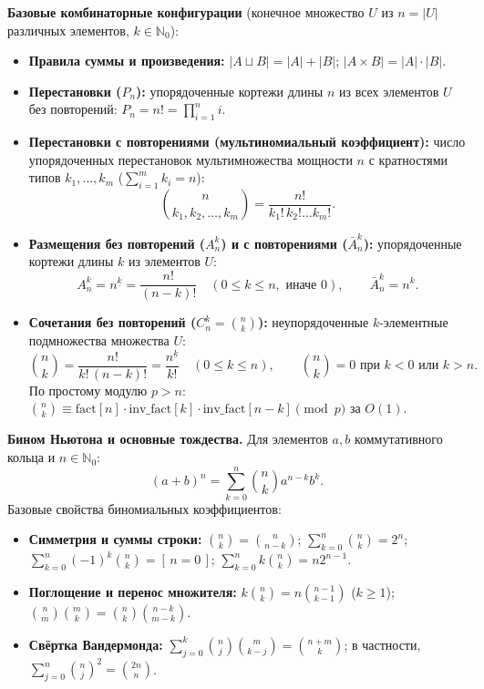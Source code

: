\documentclass[10pt,a4paper]{article}
\renewcommand{\le}{\leqslant}
\renewcommand{\ge}{\geqslant}
\newcommand{\N}{\mathbb{N}}
\newcommand{\iverson}[1]{[\,#1\,]}
\newcommand{\fall}[2]{#1^{\underline{#2}}}
\begin{document}
\textbf{Базовые комбинаторные конфигурации} (конечное множество $U$ из $n = |U|$ различных элементов, $k \in \N_0$):
\begin{itemize}
  \item \textbf{Правила суммы и произведения:} $|A \sqcup B| = |A| + |B|$; $|A \times B| = |A| \cdot |B|$.
  \item \textbf{Перестановки ($P_n$):} упорядоченные кортежи длины $n$ из всех элементов $U$ без повторений: $P_n = n! = \prod_{i=1}^n i$.
  \item \textbf{Перестановки с повторениями (мультиномиальный коэффициент):} число упорядоченных перестановок мультимножества мощности $n$ с кратностями типов $k_1, \dots, k_m$ ($\sum_{i=1}^m k_i = n$):
  \[
    \binom{n}{k_1, k_2, \dots, k_m} = \frac{n!}{k_1!\,k_2!\dots k_m!}.
  \]
  \item \textbf{Размещения без повторений ($A_n^k$) и с повторениями ($\bar{A}_n^k$):} упорядоченные кортежи длины $k$ из элементов $U$:
  \[
    A_n^k = \fall{n}{k} = \frac{n!}{(n - k)!} \quad (0 \le k \le n, \text{ иначе } 0), \qquad \bar{A}_n^k = n^k.
  \]
  \item \textbf{Сочетания без повторений ($C_n^k = \binom{n}{k}$):} неупорядоченные $k$-элементные подмножества множества $U$:
  \[
    \binom{n}{k} = \frac{n!}{k!\,(n - k)!} = \frac{\fall{n}{k}}{k!} \quad (0 \le k \le n), \qquad \binom{n}{k} = 0 \text{ при } k < 0 \text{ или } k > n.
  \]
  По простому модулю $p > n$: $\binom{n}{k} \equiv \mathrm{fact}[n] \cdot \mathrm{inv\_fact}[k] \cdot \mathrm{inv\_fact}[n-k] \pmod p$ за $O(1)$.
\end{itemize}

\textbf{Бином Ньютона и основные тождества.} Для элементов $a, b$ коммутативного кольца и $n \in \N_0$:
\[
  (a + b)^n = \sum_{k=0}^{n} \binom{n}{k} a^{n-k} b^k.
\]
Базовые свойства биномиальных коэффициентов:
\begin{itemize}
  \item \textbf{Симметрия и суммы строки:} $\binom{n}{k} = \binom{n}{n-k}$; $\sum_{k=0}^n \binom{n}{k} = 2^n$; $\sum_{k=0}^n (-1)^k \binom{n}{k} = \iverson{n = 0}$; $\sum_{k=0}^n k\binom{n}{k} = n 2^{n-1}$.
  \item \textbf{Поглощение и перенос множителя:} $k\binom{n}{k} = n\binom{n-1}{k-1}$ ($k \ge 1$); $\binom{n}{m}\binom{m}{k} = \binom{n}{k}\binom{n-k}{m-k}$.
  \item \textbf{Свёртка Вандермонда:} $\sum_{j=0}^{k} \binom{n}{j}\binom{m}{k-j} = \binom{n+m}{k}$; в частности, $\sum_{j=0}^n \binom{n}{j}^2 = \binom{2n}{n}$.
\end{itemize}
\end{document}
